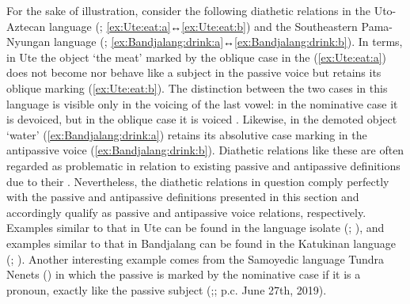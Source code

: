 For the sake of illustration, consider the following diathetic relations in the Uto-Aztecan language  (; \ref{ex:Ute:eat:a}↔\ref{ex:Ute:eat:b}) and the Southeastern Pama-Nyungan language  (; \ref{ex:Bandjalang:drink:a}↔\ref{ex:Bandjalang:drink:b}). In  terms, in Ute the object ‘the meat’ marked by the oblique case in the  (\ref{ex:Ute:eat:a}) does not become nor behave like a subject in the passive voice but retains its oblique marking (\ref{ex:Ute:eat:b}). The distinction between the two cases in this language is visible only in the voicing of the last vowel: in the nominative case it is devoiced, but in the oblique case it is voiced \citep[93f.]{givon:2011}. Likewise, in  the demoted object ‘water’ (\ref{ex:Bandjalang:drink:a}) retains its absolutive case marking in the antipassive voice (\ref{ex:Bandjalang:drink:b}). Diathetic relations like these are often regarded as problematic in relation to existing passive and antipassive definitions due to their . Nevertheless, the diathetic relations in question comply perfectly with the passive and antipassive definitions presented in this section and accordingly qualify as passive and antipassive voice relations, respectively. Examples similar to that in Ute can be found in the language isolate  (; \citealt[282ff.]{kibebe:2015}), and examples similar to that in Bandjalang can be found in the Katukinan language  (; \citealt[350]{dos-anjos:2011}). Another interesting example comes from the Samoyedic language Tundra Nenets () in which the passive  is marked by the nominative case if it is a pronoun, exactly like the passive subject (\citealt[240f.]{nikolaeva:2014};; p.c. June 27th, 2019).

